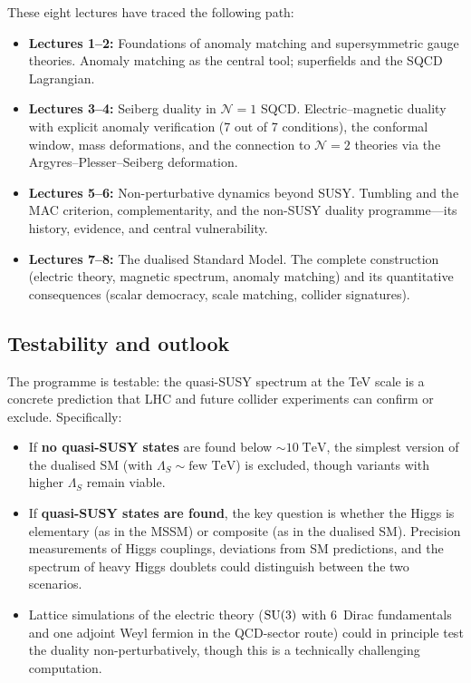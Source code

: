 \documentclass[11pt,a4paper]{article}
\begin{document}
These eight lectures have traced the following path:
\begin{itemize}
  \item \textbf{Lectures 1--2:} Foundations of anomaly matching and
    supersymmetric gauge theories.  Anomaly matching as the central
    tool; superfields and the SQCD Lagrangian.
  \item \textbf{Lectures 3--4:} Seiberg duality in $\mathcal{N} = 1$
    SQCD.  Electric--magnetic duality with explicit anomaly
    verification (7 out of 7 conditions), the conformal window, mass
    deformations, and the connection to $\mathcal{N} = 2$ theories
    via the Argyres--Plesser--Seiberg deformation.
  \item \textbf{Lectures 5--6:} Non-perturbative dynamics beyond SUSY.
    Tumbling and the MAC criterion, complementarity, and the
    non-SUSY duality programme---its history, evidence, and central
    vulnerability.
  \item \textbf{Lectures 7--8:} The dualised Standard Model.  The
    complete construction (electric theory, magnetic spectrum, anomaly
    matching) and its quantitative consequences (scalar democracy,
    scale matching, collider signatures).
\end{itemize}

\subsection{Testability and outlook}

The programme is testable: the quasi-SUSY spectrum at the TeV scale is
a concrete prediction that LHC and future collider experiments can
confirm or exclude.  Specifically:
\begin{itemize}
  \item If \textbf{no quasi-SUSY states} are found below
    $\sim 10\;\text{TeV}$, the simplest version of the dualised SM
    (with $\Lambda_S \sim \text{few TeV}$) is excluded, though
    variants with higher $\Lambda_S$ remain viable.
  \item If \textbf{quasi-SUSY states are found}, the key question is
    whether the Higgs is elementary (as in the MSSM) or composite (as
    in the dualised SM).  Precision measurements of Higgs couplings,
    deviations from SM predictions, and the spectrum of heavy Higgs
    doublets could distinguish between the two scenarios.
  \item Lattice simulations of the electric theory
    ($\mathrm{SU}(3)$ with 6~Dirac fundamentals and one adjoint Weyl fermion in
    the QCD-sector route) could in principle
    test the duality non-perturbatively, though this is a technically
    challenging computation.
\end{itemize}
\end{document}
